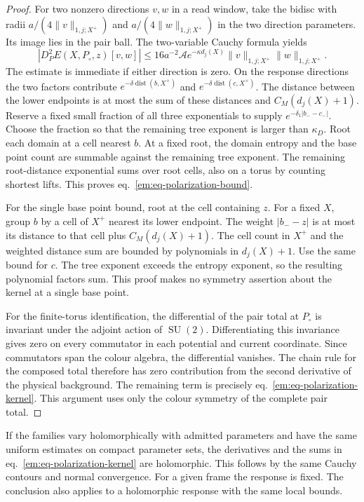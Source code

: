 \documentclass[11pt,letterpaper,reqno]{amsart}
\numberwithin{equation}{section}
\renewcommand{\eqref}[1]{\textup{eq.~\ref{#1}}}
\theoremstyle{definition}
\theoremstyle{remark}
\begin{document}
\begin{proof}
For two nonzero directions $v,w$ in a read window, take the bidisc
with radii $a/(4\|v\|_{1,j;X^+})$ and
$a/(4\|w\|_{1,j;X^+})$ in the two direction parameters. Its image
lies in the pair ball. The two-variable Cauchy formula yields
\[
 |D_P^2E(X,P_\circ,z)[v,w]|
   \le 16a^{-2}\mathcal A e^{-\kappa d_j(X)}
                  \|v\|_{1,j;X^+}\|w\|_{1,j;X^+} .
\]
The estimate is immediate if either direction is zero. On the
response directions the two factors contribute
$e^{-\delta\operatorname{dist}(b,X^+)}$ and
$e^{-\delta\operatorname{dist}(c,X^+)}$. The distance between the
lower endpoints is at most the sum of these distances and
$C_M(d_j(X)+1)$. Reserve a fixed small fraction of all three
exponentials to supply $e^{-\delta_1|b_--c_-|}$. Choose the fraction
so that the remaining tree exponent is larger than $\kappa_D$.
Root each domain at a cell nearest $b$. At a fixed root, the domain
entropy and the base point count are summable against the remaining
tree exponent. The remaining root-distance exponential sums over
root cells, also on a torus by counting shortest lifts. This proves
\eqref{em:eq-polarization-bound}.

For the single base point bound, root at the cell containing $z$.
For a fixed $X$, group $b$ by a cell of $X^+$ nearest its lower
endpoint. The weight $|b_--z|$ is at most its distance to that cell
plus $C_M(d_j(X)+1)$. The cell count in $X^+$ and the weighted
distance sum are bounded by polynomials in $d_j(X)+1$. Use the same
bound for $c$. The tree exponent exceeds the entropy exponent, so
the resulting polynomial factors sum. This proof makes no symmetry
assertion about the kernel at a single base point.

For the finite-torus identification, the differential of the pair
total at $P_\circ$ is invariant under the adjoint action of
$\operatorname{SU}(2)$. Differentiating this invariance gives zero on
every commutator in each potential and current coordinate. Since
commutators span the colour algebra, the differential vanishes.
The chain rule for the composed total therefore has zero contribution
from the second derivative of the physical background. The remaining
term is precisely \eqref{em:eq-polarization-kernel}. This argument
uses only the colour symmetry of the complete pair total.
\end{proof}

If the families vary holomorphically with admitted parameters and
have the same uniform estimates on compact parameter sets, the
derivatives and the sums in \eqref{em:eq-polarization-kernel} are
holomorphic. This follows by the same Cauchy contours and normal
convergence. For a given frame the response is fixed. The conclusion
also applies to a holomorphic response with the same local bounds.
\end{document}
